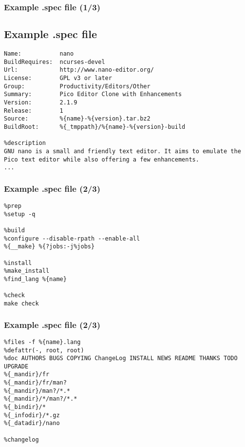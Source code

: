 \begin{frame}[fragile,t]
	\frametitle{Example .spec file (1/3)}
	\subsection{Example .spec file}
	\begin{small}
	\begin{verbatim}
Name:           nano  
BuildRequires:  ncurses-devel  
Url:            http://www.nano-editor.org/  
License:        GPL v3 or later  
Group:          Productivity/Editors/Other  
Summary:        Pico Editor Clone with Enhancements  
Version:        2.1.9  
Release:        1  
Source:         %{name}-%{version}.tar.bz2  
BuildRoot:      %{_tmppath}/%{name}-%{version}-build  

%description  
GNU nano is a small and friendly text editor. It aims to emulate the  
Pico text editor while also offering a few enhancements.
...

	\end{verbatim}
	\end{small}
\end{frame}
\begin{frame}[fragile,t]
	\frametitle{Example .spec file (2/3)}
	\begin{small}
	\begin{verbatim}
%prep  
%setup -q 
 
%build  
%configure --disable-rpath --enable-all  
%{__make} %{?jobs:-j%jobs}  
  
%install  
%make_install  
%find_lang %{name}
  
%check  
make check  

	\end{verbatim}
	\end{small}
\end{frame}
\begin{frame}[fragile,t]
	\frametitle{Example .spec file (2/3)}
	\begin{small}
	\begin{verbatim}
%files -f %{name}.lang  
%defattr(-, root, root)  
%doc AUTHORS BUGS COPYING ChangeLog INSTALL NEWS README THANKS TODO UPGRADE  
%{_mandir}/fr  
%{_mandir}/fr/man?  
%{_mandir}/man?/*.*  
%{_mandir}/*/man?/*.*  
%{_bindir}/*  
%{_infodir}/*.gz  
%{_datadir}/nano  
  
%changelog
	\end{verbatim}
	\end{small}
\end{frame}


